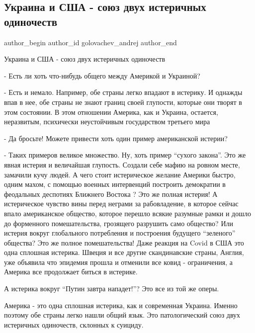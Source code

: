  
 
 
 
 
 
\subsection{Украина и США - союз двух истеричных одиночеств}
\label{sec:12_02_2022.fb.golovachev_andrej.1.ukraina_i_usa_sojuz_isterichnyh_odinochestv}
 
\ifcmt
 author_begin
   author_id golovachev_andrej
 author_end
\fi

Украина и США - союз двух истеричных одиночеств

- Есть ли  хоть что-нибудь общего между Америкой и Украиной?

- Есть и немало.  Например,  обе страны легко впадают в истерику. И однажды
впав в нее, обе страны не знают границ своей глупости, которые они творят в
этом  состоянии. В этом отношении Америка, как и Украина, остается, неразвитым,
психически неустойчивым государством третьего мира

- Да бросьте! Можете привести хоть один пример американской истерии?

- Таких примеров великое множество. Ну, хоть пример \enquote{сухого закона}. Это же
явная истерия и величайшая глупость. Создали себе мафию на ровном месте,
замачили кучу людей.  А чего стоит истерическое желание Америки быстро, одним
махом, с помощью военных интервенций  построить демократии в феодальных
деспотиях   Ближнего Востока ?  Это же полная истерия!  А истерическое чувство
вины перед неграми за рабовладение, в которое сейчас впало американское
общество, которое перешло всякие разумные рамки и дошло  до форменного
помешательства, грозящего  разрушить само общество?   Или истерия вокруг
глобального потребления и построения будущего \enquote{зеленого} общества? Это
же полное помешательства!  Даже реакция на Covid  в США  это одна сплошная
истерика.  Швеция и все другие скандинавские страны, Англия,  уже объявила что
эпидемия прошла и отменили все ковид - ограничения, а Америка  все продолжает
биться в истерике.

А истерика вокруг \enquote{Путин завтра нападет!}?  Это все из той же оперы.

Америка - это одна сплошная истерика, как и современная Украина. Именно поэтому
обе страны  легко нашли общий язык. Это патологический союз двух истеричных
одиночеств, склонных к суициду.
